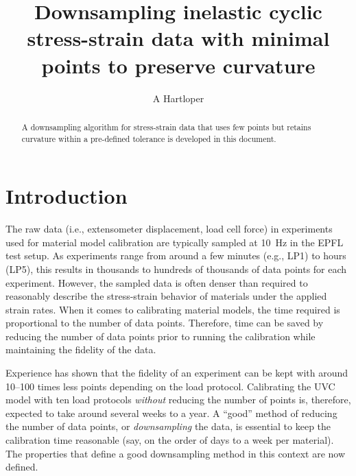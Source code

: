 \documentclass[a4paper,11pt]{article}
\title{Downsampling inelastic cyclic stress-strain data with minimal points to preserve curvature}
\author{A Hartloper}
\begin{document}
\maketitle

\begin{abstract}
    A downsampling algorithm for stress-strain data that uses few points but retains curvature within a pre-defined tolerance is developed in this document.
\end{abstract}

\section{Introduction}

The raw data (i.e., extensometer displacement, load cell force) in experiments used for material model calibration are typically sampled at 10~Hz in the EPFL test setup.
As experiments range from around a few minutes (e.g., LP1) to hours (LP5), this results in thousands to hundreds of thousands of data points for each experiment.
However, the sampled data is often denser than required to reasonably describe the stress-strain behavior of materials under the applied strain rates.
When it comes to calibrating material models, the time required is proportional to the number of data points.
Therefore, time can be saved by reducing the number of data points prior to running the calibration while maintaining the fidelity of the data.

Experience has shown that the fidelity of an experiment can be kept with around 10--100 times less points depending on the load protocol.
Calibrating the UVC model with ten load protocols \emph{without} reducing the number of points is, therefore, expected to take around several weeks to a year.
A ``good'' method of reducing the number of data points, or \emph{downsampling} the data, is essential to keep the calibration time reasonable (say, on the order of days to a week per material).
The properties that define a good downsampling method in this context are now defined.
\end{document}
